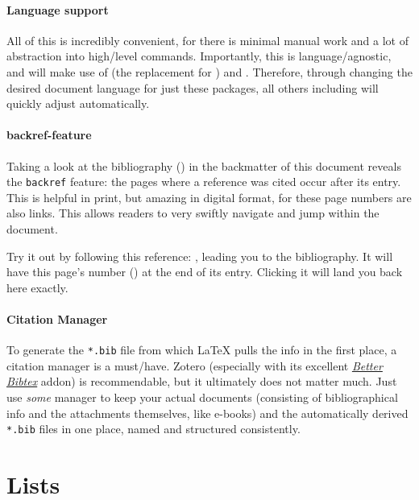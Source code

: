 \paragraph{Language support}
All of this is incredibly convenient, for there is minimal manual work and a lot
of abstraction into high\-/level commands.
Importantly, this is language\-/agnostic, and  will make use
of  (the  replacement for )
and .
Therefore, through changing the desired document language for just these packages,
all others including  will quickly adjust automatically.

\paragraph{backref-feature}
Taking a look at the bibliography () in the backmatter
of this document reveals the \texttt{backref} feature:
the pages where a reference was cited occur after its entry.
This is helpful in print, but amazing in digital format, for these page numbers
are also links.
This allows readers to very swiftly navigate and jump within the document.

Try it out by following this reference: \cite{diracPrinciplesQuantumMechanics1981},
leading you to the bibliography.
\label{backref_example}
It will have this page's number () at the end of its entry.
Clicking it will land you back here exactly.

\paragraph{Citation Manager}
To generate the \texttt{*.bib} file from which \LaTeX{} pulls the info in the
first place, a citation manager is a must\-/have.
Zotero
(especially with its excellent \href{https://retorque.re/zotero-better-bibtex/}{\emph{Better Bibtex}} addon)
is recommendable, but it ultimately does not matter much.
Just use \emph{some} manager to keep your actual documents
(consisting of bibliographical info and the attachments themselves, like e-books)
and the automatically derived \texttt{*.bib} files in one place,
named and structured consistently.

\section{Lists}

